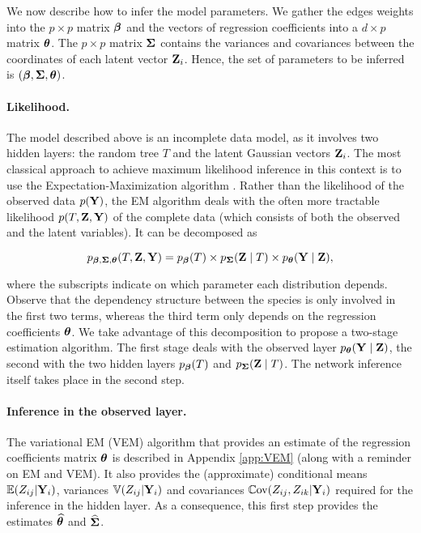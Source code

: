 We now describe how to infer the model parameters. We gather the edges weights into the $p \times p$ matrix ${\boldsymbol{\beta}}$ and the vectors of regression coefficients into a $d \times p$ matrix ${\boldsymbol{\theta}}$. The $p \times p$ matrix ${\boldsymbol{\Sigma}}$ contains the variances and covariances between the coordinates of each latent vector ${\bf Z}_i$. Hence, the set of parameters to be inferred is $({\boldsymbol{\beta}}, {\boldsymbol{\Sigma}}, {\boldsymbol{\theta}})$.

\paragraph{Likelihood.} 
The model described above is an incomplete data model, as it involves two hidden layers: the random tree $T$ and the latent Gaussian vectors ${\bf Z}_i$. The most classical approach to achieve maximum likelihood inference in this context is to use the Expectation-Maximization algorithm \citep[EM:][]{DLR77}. Rather than the likelihood of the observed data $p({\bf Y})$, the EM algorithm deals with the often more tractable likelihood $p(T, {\bf Z}, {\bf Y})$ of the complete data (which consists of both the observed and the latent variables). It can be decomposed as 
\begin{linenomath*}
\begin{equation} \label{eq:PTZY}
    p_{{\boldsymbol{\beta}}, {\boldsymbol{\Sigma}}, {\boldsymbol{\theta}}}(T, {\bf Z}, {\bf Y}) = p_{{\boldsymbol{\beta}}}(T) \times p_{{\boldsymbol{\Sigma}}}({\bf Z} \; | \; T) \times p_{{\boldsymbol{\theta}}}({\bf Y} \; | \; {\bf Z}),
\end{equation}
\end{linenomath*}
where the subscripts indicate on which parameter each distribution depends. \\
Observe that the dependency structure between the species is only involved in the first two terms, whereas the third term only depends on the regression coefficients ${\boldsymbol{\theta}}$. 
We take advantage of this decomposition to propose a two-stage estimation algorithm. The first stage deals with the observed layer $p_{{\boldsymbol{\theta}}}({\bf Y} \; | \; {\bf Z})$, the second with the two hidden layers $p_{{\boldsymbol{\beta}}}(T)$ and  $p_{{\boldsymbol{\Sigma}}}({\bf Z} \; | \; T)$. The network inference itself takes place in the second step.

\paragraph{Inference in the observed layer.} 
The variational EM (VEM) algorithm that provides an estimate of the regression coefficients matrix ${\boldsymbol{\theta}}$ is described in Appendix \ref{app:VEM} (along with a reminder on EM and VEM). It also provides the (approximate) conditional means $\operatorname*{\mathbb{E}}(Z_{ij} | {\bf Y}_i)$, variances $\operatorname*{\mathbb{V}}(Z_{ij} | {\bf Y}_i)$ and covariances $\operatorname*{\mathbb{C}\text{ov}}(Z_{ij}, Z_{ik} | {\bf Y}_i)$ required for the inference in the hidden layer. As a consequence, this first step provides the estimates $\widehat{{\boldsymbol{\theta}}}$ and $\widehat{{\boldsymbol{\Sigma}}}$.

